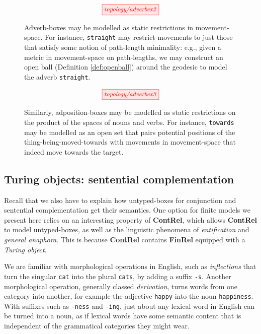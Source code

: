 \begin{figure}[h!]
\[\scalebox{0.9}{\tikzfig{topology/adverbex2}}\]
\caption{
Adverb-boxes may be modelled as static restrictions in movement-space. For instance, \texttt{straight} may restrict movements to just those that satisfy some notion of path-length minimality: e.g., given a metric in movement-space on path-lengths, we may construct an open ball (Definition \ref{def:openball}) around the geodesic to model the adverb \texttt{straight}.
}
\end{figure}

\begin{figure}[h!]
\[\scalebox{0.9}{\tikzfig{topology/adverbex3}}\]
\caption{
Similarly, adposition-boxes may be modelled as static restrictions on the product of the spaces of nouns and verbs. For instance, \texttt{towards} may be modelled as an open set that pairs potential positions of the thing-being-moved-towards with movements in movement-space that indeed move towards the target.
}
\end{figure}

\clearpage

\subsection{Turing objects: sentential complementation}

Recall that we also have to explain how untyped-boxes for conjunction and sentential complementation get their semantics. One option for finite models we present here relies on an interesting property of \textbf{ContRel}, which allows \textbf{ContRel} to model untyped-boxes, as well as the linguistic phenomena of \emph{entification} and \emph{general anaphora}. This is because \textbf{ContRel} contains \textbf{FinRel} equipped with a \emph{Turing object}.

 We are familiar with morphological operations in English, such as \emph{inflections} that turn the singular \texttt{cat} into the plural \texttt{cats}, by adding a suffix \texttt{-s}. Another morphological operation, generally classed \emph{derivation}, turns words from one category into another, for example the adjective \texttt{happy} into the noun \texttt{happiness}. With suffixes such as \texttt{-ness} and \texttt{-ing}, just about any lexical word in English can be turned into a noun, as if lexical words have some semantic content that is independent of the grammatical categories they might wear.

